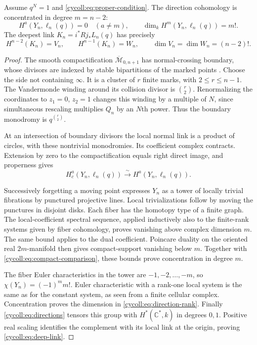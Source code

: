 \begin{theorem}\label{cycoll:thm:deep-link}
Assume $q^N=1$ and \eqref{cycoll:eq:proper-condition}.
The direction cohomology is concentrated in degree $m=n-2$:
\begin{equation}\label{cycoll:eq:direction-rank}
 H^a(Y_n,\ell_n(q))=0\quad(a\ne m),\qquad
 \dim_k H^m(Y_n,\ell_n(q))=m!.
\end{equation}
The deepest link $K_n=i^*Rj_*L_n(q)$ has precisely
\begin{equation}\label{cycoll:eq:deep-link}
 H^{n-2}(K_n)=V_n,\qquad H^{n-1}(K_n)=W_n,
 \qquad \dim V_n=\dim W_n=(n-2)!.
\end{equation}
\end{theorem}
\begin{proof}
The smooth compactification
$\overline{\mathcal M}_{0,n+1}$ has normal-crossing boundary,
whose divisors are indexed by stable bipartitions of the
marked points \cite[\S2.6]{cycoll:Brown}.
Choose the side not containing $\infty$. It is a cluster
of $r$ finite marks, with $2\leq r\leq n-1$.
The Vandermonde winding around its collision divisor is
$\binom r2$. Renormalizing the coordinates to $z_1=0$,
$z_2=1$ changes this winding by a multiple of $N$, since
simultaneous rescaling multiplies $Q_n$ by an $N$th power.
Thus the boundary monodromy is $q^{\binom r2}$.

At an intersection of boundary divisors the local normal
link is a product of circles, with these nontrivial
monodromies. Its coefficient complex contracts. Extension
by zero to the compactification equals right direct image,
and properness gives
\begin{equation}\label{cycoll:eq:compact-comparison}
 H_c^a(Y_n,\ell_n(q))\xrightarrow{\sim}
 H^a(Y_n,\ell_n(q)).
\end{equation}

Successively forgetting a moving point expresses $Y_n$
as a tower of locally trivial fibrations by punctured
projective lines. Local trivializations follow by moving
the punctures in disjoint disks. Each fiber has the
homotopy type of a finite graph. The local-coefficient
spectral sequence, applied inductively also to the
finite-rank systems given by fiber cohomology, proves
vanishing above complex dimension $m$.
The same bound applies to the dual coefficient.
Poincare duality on the oriented real $2m$-manifold then
gives compact-support vanishing below $m$.
Together with \eqref{cycoll:eq:compact-comparison}, these
bounds prove concentration in degree $m$.

The fiber Euler characteristics in the tower are
$-1,-2,\ldots,-m$, so
$\chi(Y_n)=(-1)^m m!$. Euler characteristic with a rank-one
local system is the same as for the constant system, as
seen from a finite cellular complex. Concentration proves
the dimension in \eqref{cycoll:eq:direction-rank}.
Finally \eqref{cycoll:eq:directions} tensors this group
with $H^*(\mathbb C^*,k)$ in degrees $0,1$.
Positive real scaling identifies the complement with
its local link at the origin, proving
\eqref{cycoll:eq:deep-link}.
\end{proof}

